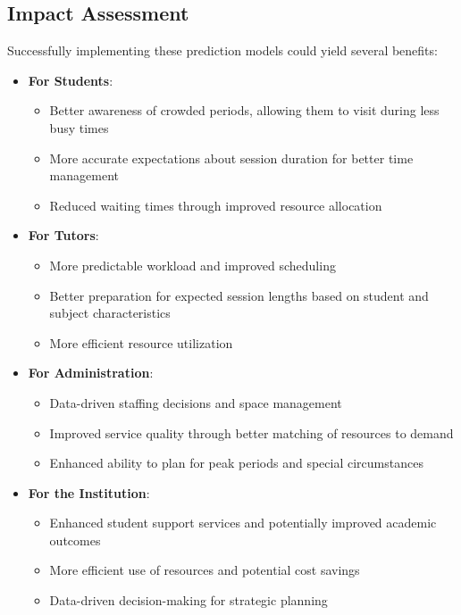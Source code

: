 \documentclass[12pt,letterpaper]{article}
\begin{document}
\subsection{Impact Assessment}

Successfully implementing these prediction models could yield several benefits:

\begin{itemize}
    \item \textbf{For Students}:
    \begin{itemize}
        \item Better awareness of crowded periods, allowing them to visit during less busy times
        \item More accurate expectations about session duration for better time management
        \item Reduced waiting times through improved resource allocation
    \end{itemize}

    \item \textbf{For Tutors}:
    \begin{itemize}
        \item More predictable workload and improved scheduling
        \item Better preparation for expected session lengths based on student and subject characteristics
        \item More efficient resource utilization
    \end{itemize}

    \item \textbf{For Administration}:
    \begin{itemize}
        \item Data-driven staffing decisions and space management
        \item Improved service quality through better matching of resources to demand
        \item Enhanced ability to plan for peak periods and special circumstances
    \end{itemize}

    \item \textbf{For the Institution}:
    \begin{itemize}
        \item Enhanced student support services and potentially improved academic outcomes
        \item More efficient use of resources and potential cost savings
        \item Data-driven decision-making for strategic planning
    \end{itemize}
\end{itemize}
\end{document}
